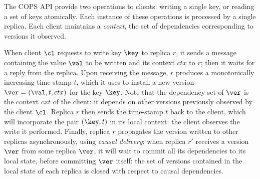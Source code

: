 The COPS API provide two operations to clients: writing a single key, or reading 
a set of keys atomically. Each instance of these operations is processed by a single replica. 
Each client maintains a \emph{context}, the set of dependencies corresponding to versions it observed.  

When client $\cl$ requests to write key $\key$ to replica $r$, it sends a message containing the value $\val$ to be written and its context $ctx$ to $r$; then  
it waits for a reply from the replica. 
Upon receiving the message, $r$ produces a monotonically increasing time-stamp $t$, which it uses to install a new version $\ver = (\val, t, ctx)$ for the key $\key$. 
Note that the dependency set of $\ver$ is the context $cxt$ of the client: 
it depends on other versions previously observed by the client $\cl$. 
Replica $r$ then sends the time-stamp $t$ back to the client, which will incorporate the pair $(\key, t)$ in its local context: 
the client observes the write it performed. Finally, replica $r$ propagates the version written to other replicas asynchronously, 
using \emph{causal delivery}: when replica $r'$ receives a version $\ver$ from some replica $\ver$, it 
will wait to commit all its dependencies to its local state, before committing $\ver$ itself: 
the set of versions contained in the local state of each replica is closed with respect to causal dependencies.
